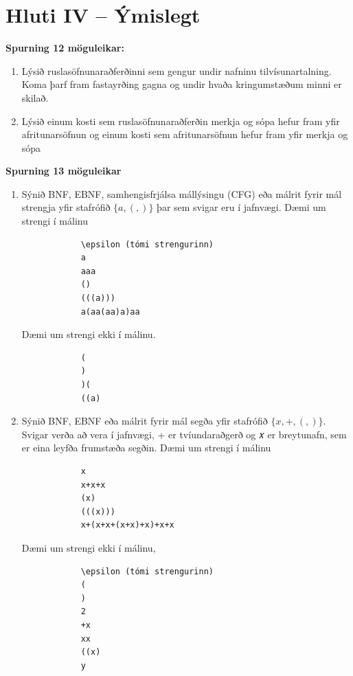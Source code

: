 \documentclass{article}
\newcommand{\bo}[1]{\textbf{#1}}
\begin{document}
    \newpage
    \section{Hluti IV – Ýmislegt}

    \bo{Spurning 12 möguleikar:}
    \begin{enumerate}
        \item Lýsið ruslasöfnunaraðferðinni sem gengur undir nafninu
        tilvísunartalning. Koma þarf fram fastayrðing gagna og undir hvaða
        kringumstæðum minni er skilað.

        \item Lýsið einum kosti sem ruslasöfnunaraðferðin merkja og sópa hefur
        fram yfir afritunarsöfnun og einum kosti sem afritunarsöfnun hefur
        fram yfir merkja og sópa
    \end{enumerate}

    \bo{Spurning 13 möguleikar}
    \begin{enumerate}
        \item Sýnið BNF, EBNF, samhengisfrjálsa mállýsingu (CFG) eða málrit
        fyrir mál strengja yfir stafrófið $\{a, (, )\}$ þar sem svigar eru í jafnvægi.
        Dæmi um strengi í málinu
        \begin{verbatim}
            \epsilon (tómi strengurinn)
            a
            aaa 
            ()
            (((a)))
            a(aa(aa)a)aa
        \end{verbatim}
        Dæmi um strengi ekki í málinu.
        \begin{verbatim}
            (
            )
            )(
            ((a)
        \end{verbatim}
        \item Sýnið BNF, EBNF eða málrit fyrir mál segða yfir stafrófið $\{𝑥, +, (, )\}$.
        Svigar verða að vera í jafnvægi, + er tvíundaraðgerð og 𝑥 er
        breytunafn, sem er eina leyfða frumstæða segðin.
        Dæmi um strengi í málinu
        \begin{verbatim}
            x
            x+x+x
            (x)
            (((x)))
            x+(x+x+(x+x)+x)+x+x
        \end{verbatim}
        Dæmi um strengi ekki í málinu,
        \begin{verbatim}
            \epsilon (tómi strengurinn)
            (
            )
            2
            +x
            xx
            ((x)
            y
        \end{verbatim}

    \end{enumerate}
\end{document}
